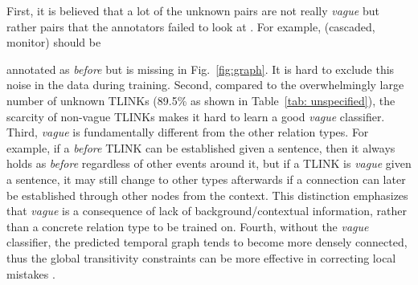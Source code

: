 \documentclass[11pt,letterpaper]{article}
\newcommand{\rel}[1]{\textit{#1}}
\newcommand{\ignore}[1]{}
\newcommand{\final}[1]{#1}
\begin{document}
First, it is believed that a lot of the unknown pairs are not really {\em vague} but rather pairs that the annotators failed to look at \citep{bethard2007timelines,cassidy2014annotation,chambers2014dense}. For example, (cascaded, monitor) should be {\final{annotated as} \rel{before} but is missing in Fig.~\ref{fig:graph}. \final{It is hard to exclude this noise in the data during training}. 
Second, compared to the overwhelmingly large number of unknown TLINKs (89.5\% as \final{shown} in Table~\ref{tab: unspecified}), the scarcity of non-vague TLINKs makes it hard to learn a good {\em vague} classifier.
Third, {\em vague} is fundamentally different from the other relation types. For example, if a {\em before} TLINK can be established given a sentence, then it always holds as {\em before} regardless of other events around it, but if a TLINK is {\em vague} given a sentence, it may still change to other types afterwards if a connection can later be established through other nodes from the context. This distinction emphasizes  that {\em vague} is a consequence of lack of background/contextual information, rather than a concrete relation type to be trained on.
Fourth, without the {\em vague} classifier, the predicted temporal graph tends to become more densely connected, thus the global transitivity constraints can be more effective in correcting local mistakes \citep{ChambersJu08}.
\ignore{
\begin{enumerate}
	\item It is believed that a lot of the {\em vague} TLINKs are actually not vague but with missing annotations \citep{bethard2007timelines,cassidy2014annotation,chambers2014dense}. This noise in data is hard to be excluded from training.
	\item Compared to the overwhelming large number of {\em vague} TLINKs, the scarcity of non-vague TLINKs makes it fundamentally  hard to learn a good {\em vague} classifier.
	\item {Vagueness} is locally undecidable and thus not well-defined for training. For example, if one {\em before} TLINK can be established given a sentence, then it always holds {\em before} regardless of the other sentences, but if a TLINK is {\em vague} according to some sentence, it may still change to other types afterwards if a connection can later be established through nodes from other sentences.
	\item Without the {\em vague} classifier, the predicted temporal graph tends to become more densely connected, for which the global transitivity constraints can be more effective in correcting local mistakes \citep{ChambersJu08}.
\end{enumerate} 
}
    
}
\end{document}
